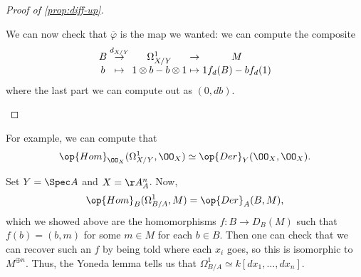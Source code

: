 \documentclass[../notes.tex]{subfiles}
\begin{document}
\begin{proof}[{Proof of \autoref{prop:diff-up}}]
\begin{itemize}
		We can now check that $\overline\varphi$ is the map we wanted: we can compute the composite
		\[\arraycolsep=1.4pt\begin{array}{ccccc}
			B &\stackrel{d_{X/Y}}\to& \Omega^1_{X/Y} &\to& M \\
			b &\mapsto& 1\otimes b-b\otimes1 &\mapsto& 1f_d(B)-bf_d(1)
		\end{array}\]
		where the last part we can compute out as $(0,db)$.
		\qedhere
	\end{itemize}
\end{proof}
\begin{example}
	For example, we can compute that
	\[\op{Hom}_{\OO_X}(\Omega^1_{X/Y},\OO_X)\simeq\op{Der}_Y(\OO_X,\OO_X).\]
\end{example}
\begin{example}
	Set $Y=\Spec A$ and $X=\AA^n_A$. Now,
	\[\op{Hom}_B(\Omega^1_{B/A},M)=\op{Der}_A(B,M),\]
	which we showed above are the homomorphisms $f\colon B\to D_B(M)$ such that $f(b)=(b,m)$ for some $m\in M$ for each $b\in B$. Then one can check that we can recover such an $f$ by being told where each $x_i$ goes, so this is isomorphic to $M^{\oplus n}$. Thus, the Yoneda lemma tells us that $\Omega^1_{B/A}\simeq k[dx_1,\ldots,dx_n]$.
\end{example}
\end{document}
